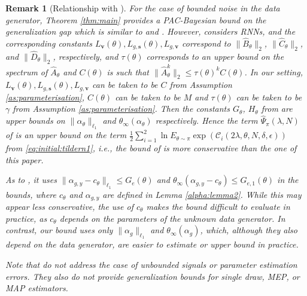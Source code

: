 \documentclass{article}
\def\rvs{{\mathbf{s}}}
\def\rvv{{\mathbf{v}}}
\newtheorem{remark}[theorem]{Remark}
\begin{document}
\begin{remark}[Relationship with \cite{eringis2023pacbayesRNN,eringis2023pacbayesian}]
  \label{rem:deividas}
 For the case of bounded noise in the data generator, Theorem \ref{thm:main} provides a PAC-Bayesian bound on the
 generalization gap which is similar to \cite[Theorem 2, Corollary 1]{eringis2023pacbayesRNN} and \cite[Theorem 5.2]{eringis2023pacbayesian}. However, \cite{eringis2023pacbayesRNN} considers RNNs, and the corresponding 
 constants $L_{\rvv}(\theta),L_{g,\rvs}(\theta),L_{g,\rvv}$ correspond to $\|\hat{B}_{\theta}\|_2$, $\|\hat{C}_{\theta}\|_2$, and $\|\hat{D}_{\theta}\|_2$, respectively, and $\tau(\theta)$ corresponds to an upper bound on the spectrum of $\hat{A}_{\theta}$
 and $C(\theta)$ is such that $\|\hat{A}_{\theta}^k\|_{2} \le \tau(\theta)^k C(\theta)$.
   In our setting, $L_{\rvv}(\theta),L_{g,\rvs}(\theta),L_{g,\rvv}$ can be taken to be $C$ from Assumption \ref{as:parameterisation}, $C(\theta)$ can be taken to be $M$ and $\tau(\theta)$ can be taken to be $\gamma$ from Assumption \ref{as:parameterisation}.
    Then the constants $G_{\theta}$, $H_{\theta}$ from \cite{eringis2023pacbayesRNN}  
    are upper bounds on $\|\alpha_{\theta}\|_{\ell_1}$ and $\theta_{\infty}(\alpha_{\theta})$ respectively.
    Hence the term $\hat{\Psi}_{\pi}(\lambda,N)$ of 
    \cite[Theorem 2, Corollary 1]{eringis2023pacbayesRNN}  is an upper bound on the term
    $\frac{1}{2}\sum_{i=1}^2 \ln E_{\theta\sim\pi} \exp\left(\mathcal{C}_i(2\lambda,\theta,N,\delta,\epsilon)\right)$ from \eqref{eq:initial:tildern1}, i.e., the bound of \cite[Theorem 2, Corollary 1]{eringis2023pacbayesRNN} is
    more conservative than the one of this paper.

  As to \cite[Theorem 5.2]{eringis2023pacbayesian}, it uses $\|\alpha_{g,y}-c_{\theta}\|_{\ell_1} \le G_e(\theta)$ and $\theta_{\infty}(\alpha_{g,y}-c_{\theta}) \le G_{e,1}(\theta)$ in the bounds, where $c_{\theta}$ and $\alpha_{g,y}$ are defined in Lemma \ref{alpha:lemma2}. While this may appear less conservative, the use of $c_{\theta}$ makes the bound difficult to evaluate in practice, as $c_{\theta}$ depends on the parameters of the unknown data generator. In contrast, our bound uses only $\|\alpha_g\|_{\ell_1}$ and $\theta_{\infty}(\alpha_g)$, which, although they also depend on the data generator, are easier to estimate or upper bound in practice.

  Note that \cite{eringis2023pacbayesRNN,eringis2023pacbayesian} do not address the case of unbounded signals or parameter estimation errors. They also do not provide generalization bounds for single draw, MEP, or MAP estimators.
\end{remark}
\end{document}

